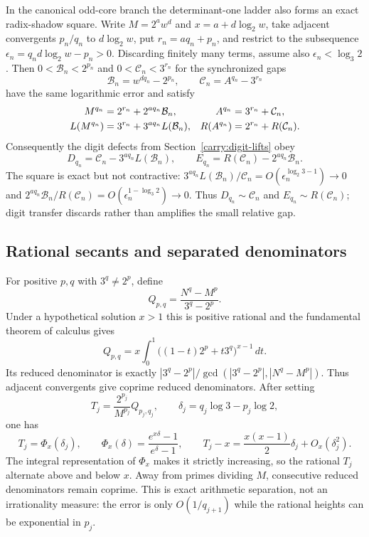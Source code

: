 \documentclass[11pt,oneside]{article}
\theoremstyle{definition}
\theoremstyle{remark}
\begin{document}
In the canonical odd-core branch the determinant-one ladder also forms an exact radix-shadow
square.  Write $M=2^aw^d$ and $x=a+d\log_2w$, take adjacent convergents $p_n/q_n$ to
$d\log_2w$, put $r_n=aq_n+p_n$, and restrict to the subsequence
$\epsilon_n=q_nd\log_2w-p_n>0$.  Discarding finitely many terms, assume also
$\epsilon_n<\log_3 2$.  Then
$0<\mathcal B_n<2^{p_n}$ and $0<\mathcal C_n<3^{r_n}$ for the synchronized gaps
\[
 \mathcal B_n=w^{dq_n}-2^{p_n},\qquad
 \mathcal C_n=A^{q_n}-3^{r_n}
\]
have the same logarithmic error and satisfy
\begin{align}
 M^{q_n}&=2^{r_n}+2^{aq_n}\mathcal B_n,&
 A^{q_n}&=3^{r_n}+\mathcal C_n,\notag\\
 L(M^{q_n})&=3^{r_n}+3^{aq_n}L(\mathcal B_n),&
 R(A^{q_n})&=2^{r_n}+R(\mathcal C_n).
 \label{gapjet:eq-radix-gap-square}
\end{align}
Consequently the digit defects from Section~\ref{carry:digit-lifts} obey
\begin{equation}
 D_{q_n}=\mathcal C_n-3^{aq_n}L(\mathcal B_n),\qquad
 E_{q_n}=R(\mathcal C_n)-2^{aq_n}\mathcal B_n.
 \label{gapjet:eq-radix-gap-defects}
\end{equation}
The square is exact but not contractive:
$3^{aq_n}L(\mathcal B_n)/\mathcal C_n=O(\epsilon_n^{\log_2 3-1})\to0$ and
$2^{aq_n}\mathcal B_n/R(\mathcal C_n)=O(\epsilon_n^{1-\log_3 2})\to0$.
Thus $D_{q_n}\sim\mathcal C_n$ and $E_{q_n}\sim R(\mathcal C_n)$; digit transfer discards rather than
amplifies the small relative gap.

\subsection{Rational secants and separated denominators}
\label{gapjet:secants}

For positive $p,q$ with $3^q\ne2^p$, define
\[
 Q_{p,q}=\frac{N^q-M^p}{3^q-2^p}.
\]
Under a hypothetical solution $x>1$ this is positive rational and the fundamental theorem
of calculus gives
\begin{equation}
 Q_{p,q}=x\int_0^1\bigl((1-t)2^p+t3^q\bigr)^{x-1}\,dt.
 \label{gapjet:eq-secant-integral}
\end{equation}
Its reduced denominator is exactly
$|3^q-2^p|/\gcd(|3^q-2^p|,|N^q-M^p|)$.  Thus adjacent convergents give coprime reduced
denominators.  After setting
\[
 T_j=\frac{2^{p_j}}{M^{p_j}}Q_{p_j,q_j},\qquad
 \delta_j=q_j\log3-p_j\log2,
\]
one has
\[
 T_j=\Phi_x(\delta_j),\qquad
 \Phi_x(\delta)=\frac{e^{x\delta}-1}{e^\delta-1},\qquad
 T_j-x=\frac{x(x-1)}2\delta_j+O_x(\delta_j^2).
\]
The integral representation of $\Phi_x$ makes it strictly increasing, so the rational
$T_j$ alternate above and below $x$.  Away from primes dividing $M$, consecutive reduced
denominators remain coprime.  This is exact arithmetic separation, not an irrationality
measure: the error is only $O(1/q_{j+1})$ while the rational heights can be exponential in
$p_j$.
\end{document}
